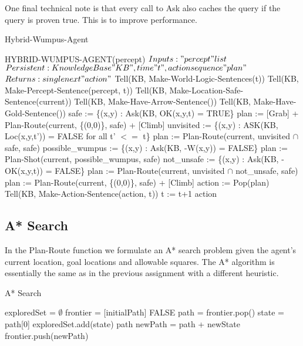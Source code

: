 One final technical note is that every call to Ask also caches the query if the query is proven true. This is to improve performance.

\begin{algorithm}[H]
\caption{Hybrid-Wumpus-Agent}
\label{hybridalg}
\begin{algorithmic}
\STATE HYBRID-WUMPUS-AGENT(percept)
\STATE $Inputs: "percept" list$
\STATE $Persistent: Knowledge Base "KB", time "t", action sequence "plan"$
\STATE $Returns: single next "action"$
\STATE Tell(KB, Make-World-Logic-Sentences(t))
\STATE Tell(KB, Make-Percept-Sentence(percept, t))
\STATE Tell(KB, Make-Location-Safe-Sentence(current))
\STATE Tell(KB, Make-Have-Arrow-Sentence())
\STATE Tell(KB, Make-Have-Gold-Sentence())
\STATE safe := \{(x,y) : Ask(KB, OK(x,y,t) = TRUE\}
	\STATE plan := {[}Grab{]} + Plan-Route(current, \{(0,0)\}, safe) + {[}Climb{]}
\ENDIF
{}
	\STATE unvisited := \{(x,y) : ASK(KB, Loc(x,y,t')) = FALSE for all t' $<=$ t\}
	\STATE plan := Plan-Route(current, unvisited $\cap$ safe, safe)
\ENDIF
{}
	\STATE possible\_wumpus := \{(x,y) : Ask(KB, -W(x,y)) = FALSE\}
	\STATE plan := Plan-Shot(current, possible\_wumpus, safe)
\ENDIF
{}
	\STATE not\_unsafe := \{(x,y) : Ask(KB, -OK(x,y,t)) = FALSE\}
	\STATE plan := Plan-Route(current, unvisited $\cap$ not\_unsafe, safe)
\ENDIF
{}
	\STATE plan := Plan-Route(current, \{(0,0)\}, safe) + {[}Climb{]}
\ENDIF
\STATE action := Pop(plan)
\STATE Tell(KB, Make-Action-Sentence(action, t))
\STATE t := t+1
\RETURN action
\end{algorithmic}
\end{algorithm}

\subsection{A* Search}

In the Plan-Route function we formulate an A* search problem given the agent's current location, goal locations and allowable squares. The A* algorithm is essentially the same as in the previous assignment with a different heuristic.

\begin{algorithm}[H]
\caption{A* Search}
\label{astaralg}
\begin{algorithmic}
\STATE exploredSet = $\emptyset$ 
\STATE frontier = [initialPath]
    \RETURN FALSE
\ENDIF
\STATE path = frontier.pop()
\STATE state = path[0]
\STATE exploredSet.add(state)
    \RETURN path
\ENDIF
{}
        \STATE newPath = path + newState
            \STATE frontier.push(newPath)
        \ENDIF
    \ENDFOR
\ENDFOR
\ENDWHILE
\end{algorithmic}
\end{algorithm}

